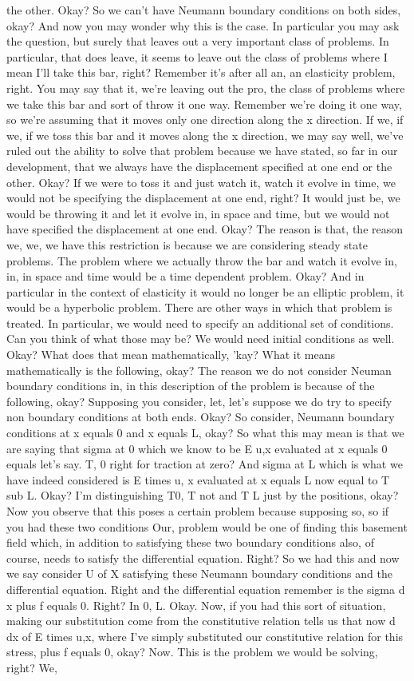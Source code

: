 \documentclass[10pt]{article}
\begin{document}
the other. Okay? So we can't have Neumann boundary conditions on both sides, okay? And now you may wonder why this is the case. In particular you may ask the question, but surely that leaves out a very important class of problems. In particular, that does leave, it seems to leave out the class of problems where I mean I'll take this bar, right? Remember it's after all an, an elasticity problem, right. You may say that it, we're leaving out the pro, the class of problems where we take this bar and sort of throw it one way. Remember we're doing it one way, so we're assuming that it moves only one direction along the x direction. If we, if we, if we toss this bar and it moves along the x direction, we may say well, we've ruled out the ability to solve that problem because we have stated, so far in our development, that we always have the displacement specified at one end or the other. Okay? If we were to toss it and just watch it, watch it evolve in time, we would not be specifying the displacement at one end, right? It would just be, we would be throwing it and let it evolve in, in space and time, but we would not have specified the displacement at one end. Okay? The reason is that, the reason we, we, we have this restriction is because we are considering steady state problems. The problem where we actually throw the bar and watch it evolve in, in, in space and time would be a time dependent problem. Okay? And in particular in the context of elasticity it would no longer be an elliptic problem, it would be a hyperbolic problem. There are other ways in which that problem is treated. In particular, we would need to specify an additional set of conditions. Can you think of what those may be? We would need initial conditions as well. Okay? What does that mean mathematically, 'kay? What it means mathematically is the following, okay? The reason we do not consider Neuman boundary conditions in, in this description of the problem is because of the following, okay? Supposing you consider, let, let's suppose we do try to specify non boundary conditions at both ends. Okay? So consider, Neumann boundary conditions at x equals 0 and x equals L, okay? So what this may mean is that we are saying that sigma at 0 which we know to be E u,x evaluated at x equals 0 equals let's say. T, 0 right for traction at zero? And sigma at L which is what we have indeed considered is E times u, x evaluated at x equals L now equal to T sub L. Okay? I'm distinguishing T0, T not and T L just by the positions, okay? Now you observe that this poses a certain problem because supposing so, so if you had these two conditions Our, problem would be one of finding this basement field which, in addition to satisfying these two boundary conditions also, of course, needs to satisfy the differential equation. Right? So we had this and now we say consider U of X satisfying these Neumann boundary conditions and the differential equation. Right and the differential equation remember is the sigma d x plus f equals 0. Right? In 0, L. Okay. Now, if you had this sort of situation, making our substitution come from the constitutive relation tells us that now d dx of E times u,x, where I've simply substituted our constitutive relation for this stress, plus f equals 0, okay? Now. This is the problem we would be solving, right? We, 
\end{document}
